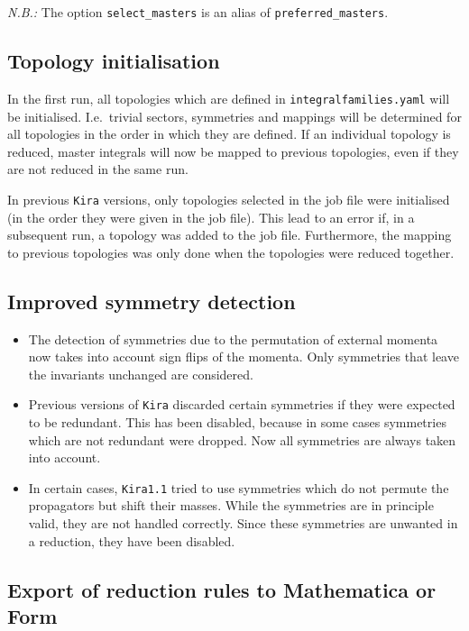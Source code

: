 \documentclass[a4paper,12pt]{article}
\newcommand*{\kira}{\texttt{Kira}}
\begin{document}
\medskip
\noindent
\textit{N.B.:} The option \texttt{select\_masters} is an alias of
\texttt{preferred\_masters}.


\subsection{Topology initialisation}

In the first run, all topologies which are defined in
\texttt{integralfamilies.yaml} will be initialised.
I.e.\ trivial sectors, symmetries and mappings will be determined for all
topologies in the order in which they are defined.
If an individual topology is reduced, master integrals will now be mapped to
previous topologies, even if they are not reduced in the same run.

In previous \kira{} versions, only topologies selected in the job file were
initialised (in the order they were given in the job file).
This lead to an error if, in a subsequent run, a topology was added to the job
file.
Furthermore, the mapping to previous topologies was only done when the
topologies were reduced together.


\subsection{Improved symmetry detection}

\begin{itemize}
  \item The detection of symmetries due to the permutation of external momenta
        now takes into account sign flips of the momenta.
        Only symmetries that leave the invariants unchanged are considered.
  \item Previous versions of \kira{} discarded certain symmetries if they were
        expected to be redundant.
        This has been disabled, because in some cases symmetries which are not
        redundant were dropped.
        Now all symmetries are always taken into account.
  \item In certain cases, \kira{}\;\texttt{1.1} tried to use symmetries which do
        not permute the propagators but shift their masses.
        While the symmetries are in principle valid, they are not handled
        correctly.
        Since these symmetries are unwanted in a reduction, they have been
disabled.
\end{itemize}


\subsection{Export of reduction rules to Mathematica or Form}
\end{document}
